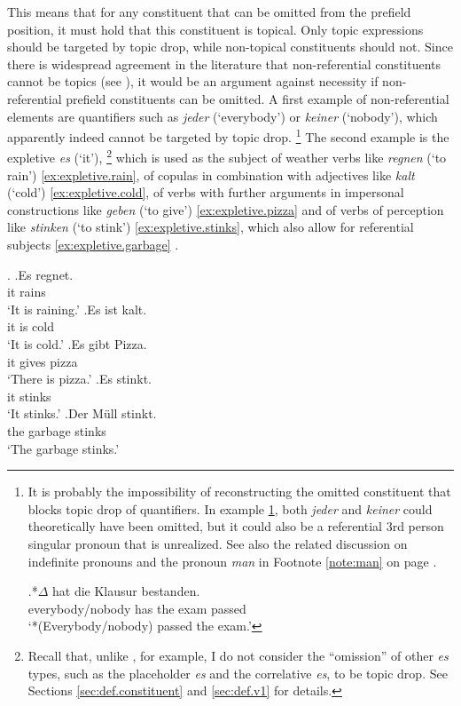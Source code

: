 \noindent
This means that for any constituent that can be omitted from the prefield position, it must hold that this constituent is topical.
Only topic expressions should be targeted by topic drop, while non-topical constituents should not.
Since there is widespread agreement in the literature that non-referential constituents cannot be topics (see ), it would be an argument against necessity if non-referential prefield constituents can be omitted.
A first example of non-referential elements are quantifiers such as \textit{jeder} (`everybody') or \textit{keiner} (`nobody'), which apparently indeed cannot be targeted by topic drop.%
\footnote{It is probably the impossibility of reconstructing the omitted constituent that blocks topic drop of quantifiers.
In example \ref{ex:quantifiers}, both \textit{jeder} and \textit{keiner} could theoretically have been omitted, but it could also be a referential 3rd person singular pronoun that is unrealized.
See also the related discussion on indefinite pronouns and the pronoun \textit{man} in Footnote \ref{note:man} on page \pageref{note:man}.

\exg.*$\Delta$ hat die Klausur bestanden.\label{ex:quantifiers}\\
everybody/nobody has the exam passed\\
`*(Everybody/nobody) passed the exam.'

}
%
The second example is the expletive  \textit{es} (`it'),%
\footnote{Recall that, unlike \citet{frick2017}, for example, I do not consider the ``omission'' of other \textit{es} types, such as the placeholder \textit{es} and the correlative \textit{es}, to be topic drop.
See Sections \ref{sec:def.constituent} and \ref{sec:def.v1} for details.}
%
which is used as the subject of weather verbs like \textit{regnen} (`to rain') \ref{ex:expletive.rain}, of copulas  in combination with adjectives like \textit{kalt} (`cold') \ref{ex:expletive.cold}, of verbs with further arguments in impersonal constructions like \textit{geben} (`to give') \ref{ex:expletive.pizza} and of verbs of perception like \textit{stinken} (`to stink') \ref{ex:expletive.stinks}, which also allow for referential subjects \ref{ex:expletive.garbage} \citep[see][191--192]{eisenberg2020}.

\ex.
\ag.Es regnet.\label{ex:expletive.rain}\\
it rains\\
`It is raining.'
\bg.Es ist kalt.\label{ex:expletive.cold}\\
it is cold\\
`It is cold.'
\bg.Es gibt Pizza.\label{ex:expletive.pizza}\\
it gives pizza\\
`There is pizza.'
\bg.Es stinkt.\label{ex:expletive.stinks}\\
it stinks\\
`It stinks.'
\bg.Der Müll stinkt.\label{ex:expletive.garbage}\\
the garbage stinks\\
`The garbage stinks.'

